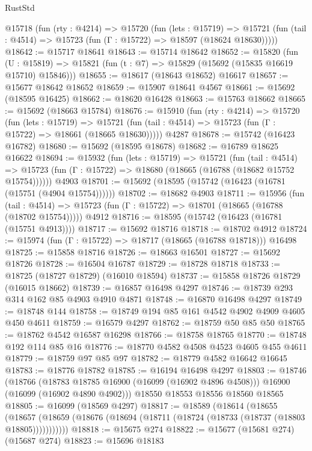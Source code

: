 \begin{lexlean}{RustStd}
\begin{coremodule}
  @15718
    (fun (rty : @4214) =>
    @15720
      (fun (lets : @15719) =>
      @15721 (fun (tail : @4514) => @15723 (fun (Γ : @15722) => @18597 (@18624 @18630)))))
@18642 := @15717 @18641
@18643 := @15714 @18642
@18652 := @15820
    (fun (U : @15819) => @15821 (fun (t : @7) => @15829 (@15692 (@15835 @16619 @15710) @15846)))
@18655 := @18617 (@18643 @18652) @16617
@18657 := @15677 @18642 @18652
@18659 := @15907 @18641 @4567
@18661 := @15692 (@18595 @16425)
@18662 := @18620 @16428
@18663 := @15763 @18662
@18665 := @15692 (@18663 @15784)
@18676 := @15910
    (fun (rty : @4214) =>
    @15720
      (fun (lets : @15719) =>
      @15721 (fun (tail : @4514) => @15723 (fun (Γ : @15722) => @18661 (@18665 @18630)))))
    @4287
@18678 := @15742 (@16423 @16782)
@18680 := @15692 (@18595 @18678)
@18682 := @16789 @18625 @16622
@18694 := @15932
    (fun (lets : @15719) =>
    @15721
      (fun (tail : @4514) =>
      @15723 (fun (Γ : @15722) => @18680 (@18665 (@16788 (@18682 @15752 @15754))))))
    @4903
@18701 := @15692 (@18595 (@15742 (@16423 (@16781 (@15751 (@4904 @15754))))))
@18702 := @18682 @4903
@18711 := @15956
    (fun (tail : @4514) => @15723 (fun (Γ : @15722) => @18701 (@18665 (@16788 (@18702 @15754)))))
    @4912
@18716 := @18595 (@15742 (@16423 (@16781 (@15751 @4913))))
@18717 := @15692 @18716
@18718 := @18702 @4912
@18724 := @15974 (fun (Γ : @15722) => @18717 (@18665 (@16788 @18718))) @16498
@18725 := @15858 @18716
@18726 := @18663 @16501
@18727 := @15692 @18726
@18728 := @16504 @16787
@18729 := @18728 @18718
@18733 := @18725 (@18727 @18729) (@16010 @18594)
@18737 := @15858 @18726 @18729 (@16015 @18662)
@18739 := @16857 @16498 @4297
@18746 := @18739 @293 @314 @162 @85 @4903 @4910 @4871
@18748 := @16870 @16498 @4297
@18749 := @18748 @144
@18758 := @18749 @194 @85 @161 @4542 @4902 @4909 @4605 @450 @4611
@18759 := @16579 @4297
@18762 := @18759 @50 @85 @50
@18765 := @18762 @4542 @16587 @16298
@18766 := @18758 @18765
@18770 := @18748 @192 @114 @85 @16
@18776 := @18770 @4582 @4508 @4523 @4605 @455 @4611
@18779 := @18759 @97 @85 @97
@18782 := @18779 @4582 @16642 @16645
@18783 := @18776 @18782
@18785 := @16194 @16498 @4297
@18803 := @18746
    (@18766
      (@18783 @18785 @16900 (@16099 (@16902 @4896 @4508)))
      @16900
      (@16099 (@16902 @4890 @4902)))
    @18550
    @18553
    @18556
    @18560
    @18565
@18805 := @16099 (@18569 @4297)
@18817 := @18589
    (@18614
      (@18655
        (@18657 (@18659 (@18676 (@18694 (@18711 (@18724 (@18733 (@18737 (@18803 @18805)))))))))))
@18818 := @15675 @274
@18822 := @15677 (@15681 @274) (@15687 @274)
@18823 := @15696 @18183

\end{coremodule}
\end{lexlean}
